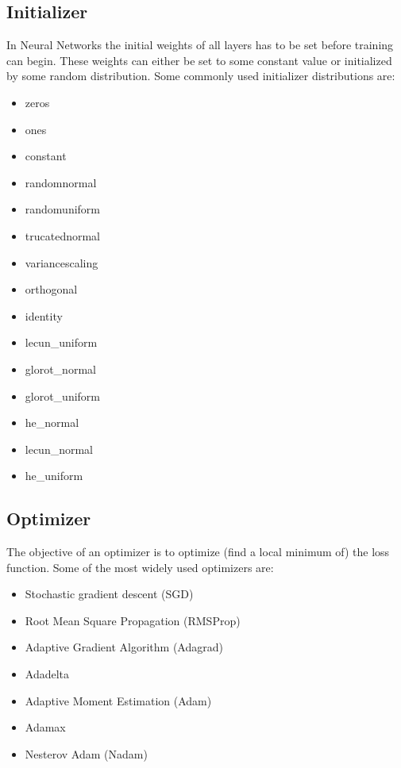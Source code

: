 \newpage

\subsection{Initializer}
In Neural Networks the initial weights of all layers has to be set before training can begin. These weights can either be set to some constant value or initialized by some random distribution. Some commonly used initializer distributions are:

\begin{multicols}{2}
\begin{itemize}
	\item zeros
	\item ones
	\item constant
	\item randomnormal
	\item randomuniform
	\item trucatednormal
	\item variancescaling
	\item orthogonal
	\item identity
	\item lecun\_uniform
	\item glorot\_normal
	\item glorot\_uniform
	\item he\_normal
	\item lecun\_normal
	\item he\_uniform
\end{itemize}
\end{multicols}

\subsection{Optimizer}
The objective of an optimizer is to optimize (find a local minimum of) the loss function. Some of the most widely used optimizers are:

\begin{itemize}
	\item Stochastic gradient descent (SGD)
	\item Root Mean Square Propagation (RMSProp)
	\item Adaptive Gradient Algorithm (Adagrad)
	\item Adadelta
	\item Adaptive Moment Estimation (Adam)
	\item Adamax
	\item Nesterov Adam (Nadam)
\end{itemize}

